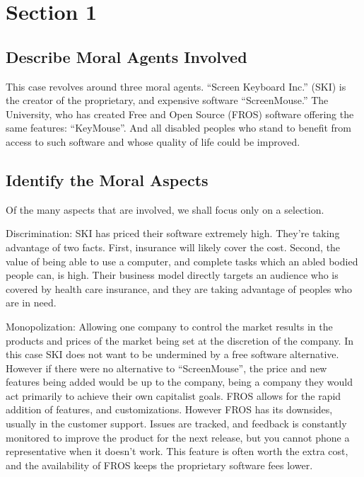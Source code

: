 \section{Section 1}
\subsection{Describe Moral Agents Involved}
This case revolves around three moral agents. ``Screen Keyboard Inc.'' (SKI) is the creator of the proprietary, and expensive software ``ScreenMouse.'' The University, who has created Free and Open Source (FROS) software offering the same features: ``KeyMouse''. And all disabled peoples who stand to benefit from access to such software and whose quality of life could be improved.
\subsection{Identify the Moral Aspects}
Of the many aspects that are involved, we shall focus only on a selection. 

Discrimination: SKI has priced their software extremely high. They’re taking advantage of two facts. First, insurance will likely cover the cost. Second, the value of being able to use a computer, and complete tasks which an abled bodied people can, is high. Their business model directly targets an audience who is covered by health care insurance, and they are taking advantage of peoples who are in need.

Monopolization: Allowing one company to control the market results in the products and prices of the market being set at the discretion of the company. In this case SKI does not want to be undermined by a free software alternative. However if there were no alternative to ``ScreenMouse'', the price and new features being added would be up to the company, being a company they would act primarily to achieve their own capitalist goals. FROS allows for the rapid addition of features, and customizations. However FROS has its downsides, usually in the customer support. Issues are tracked, and feedback is constantly monitored to improve the product for the next release, but you cannot phone a representative when it doesn’t work. This feature is often worth the extra cost, and the availability of FROS keeps the proprietary software fees lower. 
